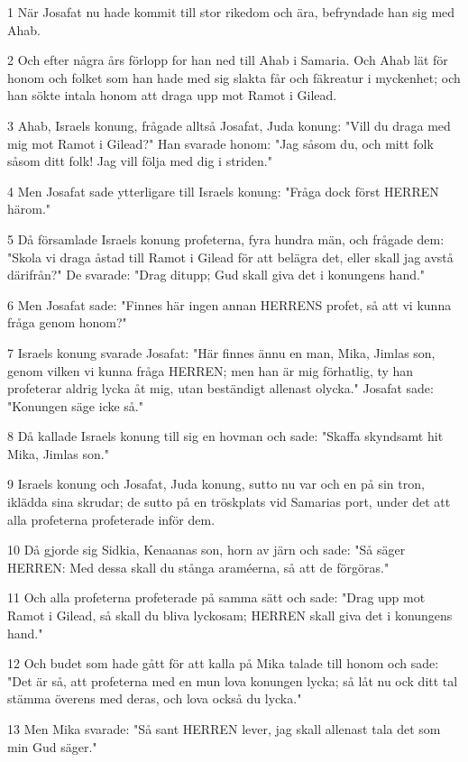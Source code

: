 \par 1 När Josafat nu hade kommit till stor rikedom och ära, befryndade han sig med Ahab.
\par 2 Och efter några års förlopp for han ned till Ahab i Samaria. Och Ahab lät för honom och folket som han hade med sig slakta får och fäkreatur i myckenhet; och han sökte intala honom att draga upp mot Ramot i Gilead.
\par 3 Ahab, Israels konung, frågade alltså Josafat, Juda konung: "Vill du draga med mig mot Ramot i Gilead?" Han svarade honom: "Jag såsom du, och mitt folk såsom ditt folk! Jag vill följa med dig i striden."
\par 4 Men Josafat sade ytterligare till Israels konung: "Fråga dock först HERREN härom."
\par 5 Då församlade Israels konung profeterna, fyra hundra män, och frågade dem: "Skola vi draga åstad till Ramot i Gilead för att belägra det, eller skall jag avstå därifrån?" De svarade: "Drag ditupp; Gud skall giva det i konungens hand."
\par 6 Men Josafat sade: "Finnes här ingen annan HERRENS profet, så att vi kunna fråga genom honom?"
\par 7 Israels konung svarade Josafat: "Här finnes ännu en man, Mika, Jimlas son, genom vilken vi kunna fråga HERREN; men han är mig förhatlig, ty han profeterar aldrig lycka åt mig, utan beständigt allenast olycka." Josafat sade: "Konungen säge icke så."
\par 8 Då kallade Israels konung till sig en hovman och sade: "Skaffa skyndsamt hit Mika, Jimlas son."
\par 9 Israels konung och Josafat, Juda konung, sutto nu var och en på sin tron, iklädda sina skrudar; de sutto på en tröskplats vid Samarias port, under det att alla profeterna profeterade inför dem.
\par 10 Då gjorde sig Sidkia, Kenaanas son, horn av järn och sade: "Så säger HERREN: Med dessa skall du stånga araméerna, så att de förgöras."
\par 11 Och alla profeterna profeterade på samma sätt och sade: "Drag upp mot Ramot i Gilead, så skall du bliva lyckosam; HERREN skall giva det i konungens hand."
\par 12 Och budet som hade gått för att kalla på Mika talade till honom och sade: "Det är så, att profeterna med en mun lova konungen lycka; så låt nu ock ditt tal stämma överens med deras, och lova också du lycka."
\par 13 Men Mika svarade: "Så sant HERREN lever, jag skall allenast tala det som min Gud säger."
